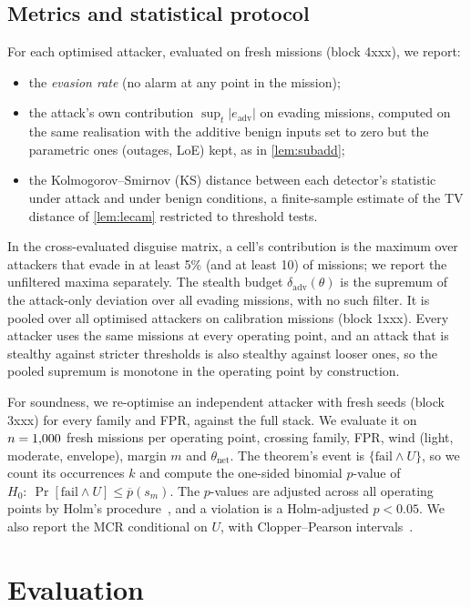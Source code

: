 \documentclass[letterpaper,twocolumn,10pt]{article}
\newcommand{\dadv}{\delta_{\mathrm{adv}}}
\newcommand{\pbar}{\overline{p}}
\theoremstyle{remark}
\begin{document}
\subsection{Metrics and statistical protocol}
For each optimised attacker, evaluated on fresh missions (block 4xxx), we report:
\begin{itemize}
\item the \emph{evasion rate} (no alarm at any point in the mission);
\item the attack's own contribution $\sup_t|e_{\mathrm{adv}}|$ on evading
  missions, computed on the same realisation with the additive benign inputs set
  to zero but the parametric ones (outages, LoE) kept, as in \cref{lem:subadd};
\item the Kolmogorov--Smirnov (KS) distance between each detector's statistic
  under attack and under benign conditions, a finite-sample estimate of the TV
  distance of \cref{lem:lecam} restricted to threshold tests.
\end{itemize}
In the cross-evaluated disguise matrix, a cell's contribution is the maximum
over attackers that evade in at least 5\% (and at least 10) of missions; we
report the unfiltered maxima separately. The stealth budget $\dadv(\theta)$ is
the supremum of the attack-only deviation over all evading missions, with
no such filter. It is pooled over all \nPooledAttackers{} optimised
attackers on calibration missions (block 1xxx). Every attacker uses the same
missions at every operating point, and an attack that is stealthy against
stricter thresholds is also stealthy against looser ones, so the pooled
supremum is monotone in the operating point by construction.

For soundness, we re-optimise an independent attacker with fresh seeds (block
3xxx) for every family and FPR, against the full stack. We evaluate it on $n=1{,}000$
fresh missions per operating point, crossing family, FPR, wind (light, moderate,
envelope), margin $m$ and $\theta_{\mathrm{net}}$. The theorem's event is
$\{\text{fail}\wedge U\}$, so we count its occurrences $k$ and compute the
one-sided binomial $p$-value of $H_0{:}\ \Pr[\text{fail}\wedge U]\le\pbar(s_m)$.
The $p$-values are adjusted across all operating points by Holm's
procedure~\cite{holm1979}, and a violation is a Holm-adjusted $p<0.05$. We
also report the MCR conditional on $U$, with Clopper--Pearson
intervals~\cite{clopper1934}.

\section{Evaluation}
\label{sec:eval}

\end{document}
